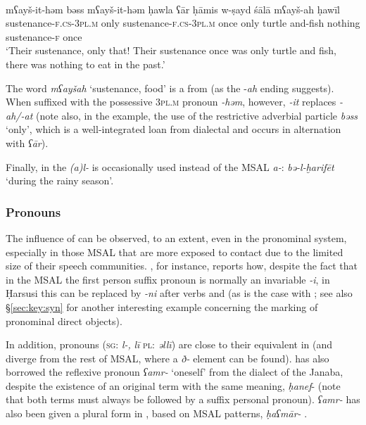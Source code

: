 \documentclass[output=paper]{langsci/langscibook}
\begin{document}
\ea
{}\\
\gll mʕayš-it-həm bəss mʕayš-it-həm ḥawla ʕār ḥāmis w-ṣayd śālā mʕayš-ah ḥawīl\\
     sustenance-\textsc{f.cs-3pl.m} only sustenance-\textsc{f.cs-3pl.m} once only turtle and-fish nothing sustenance-\textsc{f} once\\
\glt `Their sustenance, only that! Their sustenance once was only turtle and fish, there was nothing to eat in the past.'
\z
 

The word \textit{mʕayšah} ‘sustenance, food’ is a  from  (as the -\textit{ah} ending suggests). When suffixed with the possessive \textsc{3pl.m} pronoun \textit{-həm}, however,  \textit{-it} replaces \textit{-ah/-at} (note also, in the example, the use of the restrictive adverbial particle \textit{bəss} ‘only’, which is a well-integrated loan from dialectal  and occurs in alternation with  \textit{ʕār}). 

Finally, in  the    \textit{(a)l-} is occasionally used instead of the MSAL   \textit{a-}:  \textit{bə-l-ḫarifēt} ‘during the rainy season'.


 \subsubsection{Pronouns}\label{sec:key:pro}

The influence of  can be observed, to an extent, even in the pronominal system, especially in those MSAL that are more exposed to contact due to the limited size of their speech communities. \citet{Lonnet2011}, for instance, reports how, despite the fact that in the MSAL the first person suffix pronoun is normally an invariable \textit{-i}, in Ḥarsusi this can be replaced by \textit{-ni} after verbs and  (as is the case with ; see also §\ref{sec:key:syn} for another interesting example concerning the marking of pronominal direct objects).

In addition,   pronouns (\textsc{sg}: \textit{l-,} \textit{lī} \textsc{pl}: \textit{əllī}) are close to their equivalent in   (and diverge from the rest of MSAL, where a \textit{ð-} element can be found).  has also borrowed the reflexive pronoun \textit{ʕamr-} ‘oneself’ from the  dialect of the Janaba, despite the existence of an original  term with the same meaning, \textit{ḥanef}{}- (note that both terms must always be followed by a suffix personal pronoun). \textit{ʕamr-} has also been given a plural form in , based on MSAL  patterns, \textit{ḥaʕmār-} \citep[14]{Morris2017}.
\end{document}
